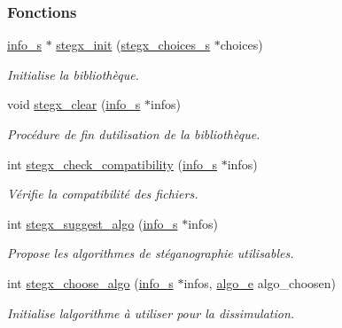 \subsubsection*{Fonctions}
\begin{DoxyCompactItemize}
\item 
\hyperlink{a00008_aa8ca908d92fb5bdd3c0a9e1f58b2cf03}{info\+\_\+s} $\ast$ \hyperlink{a00005_ab6aa5e9de0fc83d5dc066f032c75c51b}{stegx\+\_\+init} (\hyperlink{a00008_ae5a2888ba8550edd4b6da33702b83a9d}{stegx\+\_\+choices\+\_\+s} $\ast$choices)
\begin{DoxyCompactList}\small\item\em Initialise la bibliothèque. \end{DoxyCompactList}\item 
void \hyperlink{a00005_abe47a9ab49d16f6f0b4812f77e6e44c5}{stegx\+\_\+clear} (\hyperlink{a00008_aa8ca908d92fb5bdd3c0a9e1f58b2cf03}{info\+\_\+s} $\ast$infos)
\begin{DoxyCompactList}\small\item\em Procédure de fin d\textquotesingle{}utilisation de la bibliothèque. \end{DoxyCompactList}\item 
int \hyperlink{a00005_aa5b31aaae617d7c5d0c29d564e2c8a42}{stegx\+\_\+check\+\_\+compatibility} (\hyperlink{a00008_aa8ca908d92fb5bdd3c0a9e1f58b2cf03}{info\+\_\+s} $\ast$infos)
\begin{DoxyCompactList}\small\item\em Vérifie la compatibilité des fichiers. \end{DoxyCompactList}\item 
int \hyperlink{a00005_adc277622e5fe0d1814be76f11263b350}{stegx\+\_\+suggest\+\_\+algo} (\hyperlink{a00008_aa8ca908d92fb5bdd3c0a9e1f58b2cf03}{info\+\_\+s} $\ast$infos)
\begin{DoxyCompactList}\small\item\em Propose les algorithmes de stéganographie utilisables. \end{DoxyCompactList}\item 
int \hyperlink{a00005_a58f7de82387e9b66f9bd7c40c32aeb8f}{stegx\+\_\+choose\+\_\+algo} (\hyperlink{a00008_aa8ca908d92fb5bdd3c0a9e1f58b2cf03}{info\+\_\+s} $\ast$infos, \hyperlink{a00008_adbe3e383e3f1c4239b26ccae2865aa06}{algo\+\_\+e} algo\+\_\+choosen)
\begin{DoxyCompactList}\small\item\em Initialise l\textquotesingle{}algorithme à utiliser pour la dissimulation. \end{DoxyCompactList}\item 

\end{DoxyCompactItemize}
